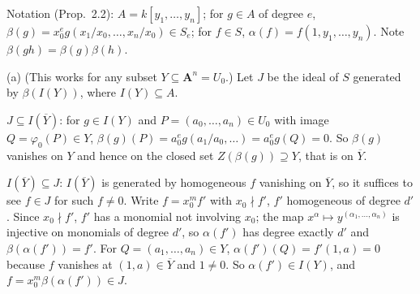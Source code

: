 \documentclass[11pt]{article}
\begin{document}
\pf
Notation (Prop.~2.2): $A=k[y_1,\dots,y_n]$; for $g\in A$ of degree $e$, $\beta(g)=x_0^eg(x_1/x_0,\dots,x_n/x_0)\in S_e$; for $f\in S$, $\alpha(f)=f(1,y_1,\dots,y_n)$. Note $\beta(gh)=\beta(g)\beta(h)$.

(a) (This works for any subset $Y\subseteq\mathbf A^n=U_0$.) Let $J$ be the ideal of $S$ generated by $\beta(I(Y))$, where $I(Y)\subseteq A$.

$J\subseteq I(\overline Y)$: for $g\in I(Y)$ and $P=(a_0,\dots,a_n)\in U_0$ with image $Q=\varphi_0(P)\in Y$, $\beta(g)(P)=a_0^eg(a_1/a_0,\dots)=a_0^eg(Q)=0$. So $\beta(g)$ vanishes on $Y$ and hence on the closed set $Z(\beta(g))\supseteq Y$, that is on $\overline Y$.

$I(\overline Y)\subseteq J$: $I(\overline Y)$ is generated by homogeneous $f$ vanishing on $\overline Y$, so it suffices to see $f\in J$ for such $f\neq0$. Write $f=x_0^mf'$ with $x_0\nmid f'$, $f'$ homogeneous of degree $d'$. Since $x_0\nmid f'$, $f'$ has a monomial not involving $x_0$; the map $x^\alpha\mapsto y^{(\alpha_1,\dots,\alpha_n)}$ is injective on monomials of degree $d'$, so $\alpha(f')$ has degree exactly $d'$ and $\beta(\alpha(f'))=f'$. For $Q=(a_1,\dots,a_n)\in Y$, $\alpha(f')(Q)=f'(1,a)=0$ because $f$ vanishes at $(1,a)\in\overline Y$ and $1\ne0$. So $\alpha(f')\in I(Y)$, and $f=x_0^m\beta(\alpha(f'))\in J$.
\end{document}
